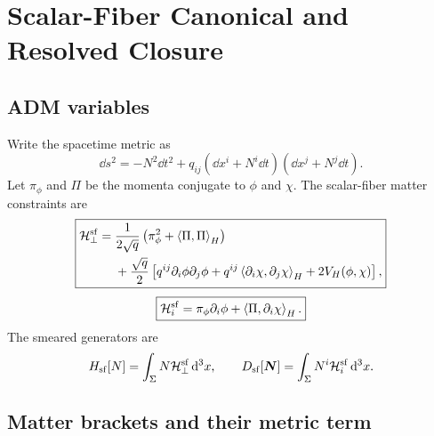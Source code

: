 \chapter{Scalar-Fiber Canonical and Resolved Closure}
\label{ch:canonical}

\section{ADM variables}

Write the spacetime metric as
\begin{equation}
\dd s^2=-N^2\dd t^2+q_{ij}(\dd x^i+N^i\dd t)(\dd x^j+N^j\dd t).
\end{equation}
Let $\pi_\phi$ and $\Pi$ be the momenta conjugate to $\phi$ and $\chi$.  The scalar-fiber matter constraints are
\begin{equation}
\boxed{
\begin{aligned}
\mathcal H_\perp^{\mathrm{sf}}={}&
\frac{1}{2\sqrt q}\left(\pi_\phi^2+\left\langle \Pi,\Pi\right\rangle_H\right)\\
&+\frac{\sqrt q}{2}\left[
q^{ij}\partial_i\phi\partial_j\phi
+q^{ij}\left\langle \partial_i\chi,\partial_j\chi\right\rangle_H
+2V_H(\phi,\chi)
\right],
\end{aligned}}
\label{eq:adm-hmatter}
\end{equation}
\begin{equation}
\boxed{
\mathcal H_i^{\mathrm{sf}}
=\pi_\phi\partial_i\phi
+\left\langle \Pi,\partial_i\chi\right\rangle_H.}
\label{eq:adm-dmatter}
\end{equation}
The smeared generators are
\begin{equation}
H_{\mathrm{sf}}[N]=\int_\Sigma N\mathcal H_\perp^{\mathrm{sf}}\,\mathrm d^3x,
\qquad
D_{\mathrm{sf}}[\bm N]=\int_\Sigma N^i\mathcal H_i^{\mathrm{sf}}\,\mathrm d^3x.
\end{equation}

\section{Matter brackets and their metric term}

